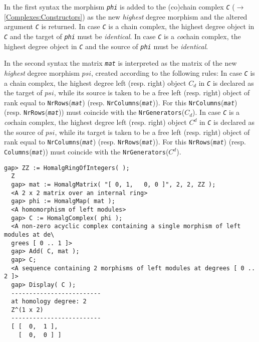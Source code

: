 \documentclass[a4paper,11pt]{report}
\begin{document}
{{{ In the first syntax the morphism \mbox{\texttt{\slshape phi}} is added to the (co)chain complex \mbox{\texttt{\slshape C}} ($\to$ \ref{Complexes:Constructors}) as the new \emph{highest} degree morphism and the altered argument \mbox{\texttt{\slshape C}} is returned. In case \mbox{\texttt{\slshape C}} is a chain complex, the highest degree object in \mbox{\texttt{\slshape C}} and the target of \mbox{\texttt{\slshape phi}} must be \emph{identical}. In case \mbox{\texttt{\slshape C}} is a \emph{co}chain complex, the highest degree object in \mbox{\texttt{\slshape C}} and the source of \mbox{\texttt{\slshape phi}} must be \emph{identical}. 

 In the second syntax the matrix \mbox{\texttt{\slshape mat}} is interpreted as the matrix of the new \emph{highest} degree morphism $psi$, created according to the following rules: In case \mbox{\texttt{\slshape C}} is a chain complex, the highest degree left (resp. right) object $C_d$ in \mbox{\texttt{\slshape C}} is declared as the target of $psi$, while its source is taken to be a free left (resp. right) object of rank
equal to \texttt{NrRows}(\mbox{\texttt{\slshape mat}}) (resp. \texttt{NrColumns}(\mbox{\texttt{\slshape mat}})). For this \texttt{NrColumns}(\mbox{\texttt{\slshape mat}}) (resp. \texttt{NrRows}(\mbox{\texttt{\slshape mat}})) must coincide with the \texttt{NrGenerators}($C_d$). In case \mbox{\texttt{\slshape C}} is a \emph{co}chain complex, the highest degree left (resp. right) object $C^d$ in \mbox{\texttt{\slshape C}} is declared as the source of $psi$, while its target is taken to be a free left (resp. right) object of rank
equal to \texttt{NrColumns}(\mbox{\texttt{\slshape mat}}) (resp. \texttt{NrRows}(\mbox{\texttt{\slshape mat}})). For this \texttt{NrRows}(\mbox{\texttt{\slshape mat}}) (resp. \texttt{Columns}(\mbox{\texttt{\slshape mat}})) must coincide with the \texttt{NrGenerators}($C^d$). 
\begin{Verbatim}[fontsize=\small,frame=single,label=Example]
  gap> ZZ := HomalgRingOfIntegers( );
  Z
  gap> mat := HomalgMatrix( "[ 0, 1,   0, 0 ]", 2, 2, ZZ );
  <A 2 x 2 matrix over an internal ring>
  gap> phi := HomalgMap( mat );
  <A homomorphism of left modules>
  gap> C := HomalgComplex( phi );
  <A non-zero acyclic complex containing a single morphism of left modules at de\
  grees [ 0 .. 1 ]>
  gap> Add( C, mat );
  gap> C;
  <A sequence containing 2 morphisms of left modules at degrees [ 0 .. 2 ]>
  gap> Display( C );
  -------------------------
  at homology degree: 2
  Z^(1 x 2)
  -------------------------
  [ [  0,  1 ],
    [  0,  0 ] ]
  

\end{Verbatim}}}}
\end{document}
